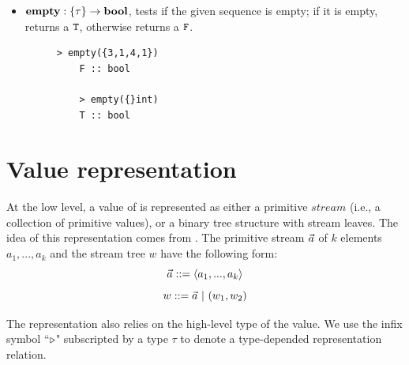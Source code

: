 \begin{itemize}
	\item $\mathbf{empty:  \{\tau\} \rightarrow \mathbf{bool}}$, tests if the given sequence is empty; if it is empty, returns a $\mathtt{T}$, otherwise returns a $\mathtt{F}$.
	\begin{figure}[H]
	\begin{example}
	\end{example}
	\begin{lstlisting}[style = nesl-style]
	> empty({3,1,4,1})
	F :: bool
	
	> empty({}int)
	T :: bool
	\end{lstlisting}
	\end{figure}
\end{itemize}


%
%	


\section{Value representation} \label{sec:valrep}
At the low level, a value of \mysnesl is represented as either a primitive $stream$ (i.e., a collection of primitive values),
or a binary tree structure with stream leaves. 
The idea of this representation comes from \cite{Blel90vecmod}. 
The primitive stream $\vec a$ of $k$ elements $a_1,...,a_k$ and the stream tree $w$ have the following form: 
$$ \a ::= \<a_1,...,a_k\'>$$
$$ w ::= \a \ | \ (w_1,w_2) $$

The representation also relies on the high-level type of the value. 
We use the infix symbol ``$ \triangleright$" subscripted by a type $\tau$ to denote a type-depended representation relation.


